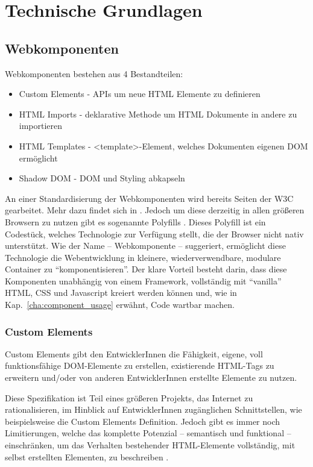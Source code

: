 \chapter{Technische Grundlagen}

\section{Webkomponenten}
Webkomponenten bestehen aus 4 Bestandteilen:
\begin{itemize}
	\item Custom Elements - APIs um neue HTML Elemente zu definieren
	\item HTML Imports - deklarative Methode um HTML Dokumente in andere zu importieren
	\item HTML Templates - <template>-Element, welches Dokumenten eigenen DOM ermöglicht
	\item Shadow DOM - DOM und Styling abkapseln
\end{itemize}
An einer Standardisierung der Webkomponenten wird bereits Seiten der W3C gearbeitet. Mehr dazu findet sich in \cite{w3c-components}. Jedoch um diese derzeitig in allen größeren Browsern zu nutzen gibt es sogenannte Polyfills \cite{polyfill}. Dieses Polyfill ist ein Codestück, welches Technologie zur Verfügung stellt, die der Browser nicht nativ unterstützt.
Wie der Name -- Webkomponente -- suggeriert, ermöglicht diese Technologie die Webentwicklung in kleinere, wiederverwendbare, modulare Container zu "`komponentisieren"'.  Der klare Vorteil besteht darin, dass diese Komponenten unabhängig von einem Framework, vollständig mit "`vanilla"' HTML, CSS und Javascript kreiert werden können und, wie in Kap.~\ref{cha:component_usage} erwähnt, Code wartbar machen.

\subsection{Custom Elements}
Custom Elements gibt den EntwicklerInnen die Fähigkeit, eigene, voll funktionsfähige DOM-Elemente zu erstellen, existierende HTML-Tags zu erweitern und/oder von anderen EntwicklerInnen erstellte Elemente zu nutzen.  

Diese Spezifikation ist Teil eines größeren Projekts, das Internet zu rationalisieren, im Hinblick auf EntwicklerInnen zugänglichen Schnittstellen, wie beispielsweise die Custom Elements Definition. Jedoch gibt es immer noch Limitierungen, welche das komplette Potenzial -- semantisch und funktional -- einschränken, um das Verhalten bestehender HTML-Elemente vollständig, mit selbst erstellten Elementen, zu beschreiben \cite{custom-elements}.

